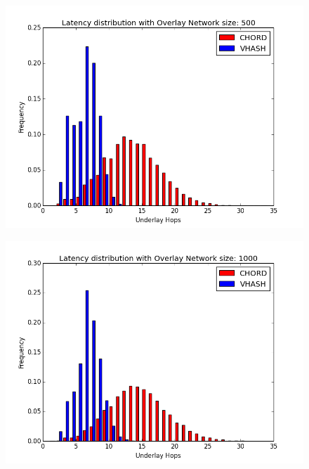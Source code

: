 \documentclass{IEEEtran}
\begin{document}
\begin{figure}
	\centering
	\includegraphics[width=\linewidth]{hist_500}
	\label{hist500}
\end{figure}

\begin{figure}
	\centering
	\includegraphics[width=\linewidth]{hist_1000}
	\label{hist1000}
\end{figure}
\end{document}
